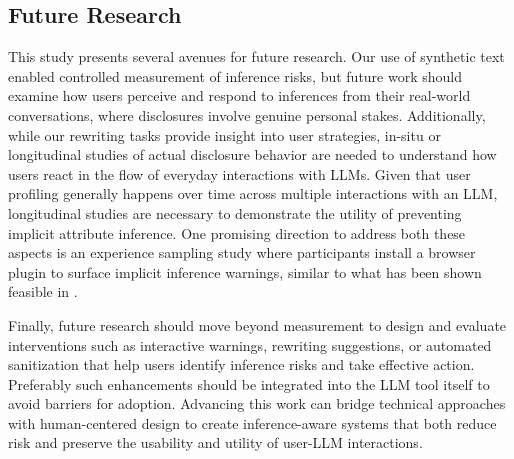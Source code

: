 \subsection{Future Research}
This study presents several avenues for future research. Our use of synthetic text enabled controlled measurement of inference risks, but future work should examine how users perceive and respond to inferences from their real-world conversations, where disclosures involve genuine personal stakes. Additionally, while our rewriting tasks provide insight into user strategies, in-situ or longitudinal studies of actual disclosure behavior are needed to understand how users react in the flow of everyday interactions with LLMs. Given that user profiling generally happens over time across multiple interactions with an LLM, longitudinal studies are necessary to demonstrate the utility of preventing implicit attribute inference. One promising direction to address both these aspects is an experience sampling study where participants install a browser plugin to surface implicit inference warnings, similar to what has been shown feasible in \cite{rescriber}.

Finally, future research should move beyond measurement to design and evaluate interventions such as interactive warnings, rewriting suggestions, or automated sanitization that help users identify inference risks and take effective action. Preferably such enhancements should be integrated into the LLM tool itself to avoid barriers for adoption. Advancing this work can bridge technical approaches with human-centered design to create inference-aware systems that both reduce risk and preserve the usability and utility of user-LLM interactions.